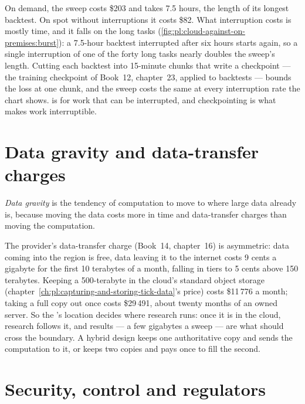 On demand, the sweep costs \$203 and takes 7.5 hours, the length of its longest backtest. On spot without interruptions it costs \$82. What
interruption costs is mostly time, and it falls on the long tasks (\cref{fig:pl:cloud-against-on-premises:burst}): a 7.5-hour backtest
interrupted after six hours starts again, so a single interruption of one of the forty long tasks nearly doubles the sweep's length. Cutting
each backtest into 15-minute chunks that write a checkpoint --- the training checkpoint of Book~12, chapter~23, applied to backtests --- bounds the
loss at one chunk, and the sweep costs the same at every interruption rate the chart shows.  is for work that can be interrupted,
and checkpointing is what makes work interruptible.

\section{Data gravity and data-transfer charges}

\begin{definition}\label{def:pl:cloud-against-on-premises:gravity}
\emph{Data gravity} is the tendency of computation to move to where large data already is, because moving the data costs
more in time and data-transfer charges than moving the computation.
\end{definition}

The provider's data-transfer charge (Book~14, chapter~16) is asymmetric: data coming into the region is free, data leaving it to the internet
costs 9 cents a gigabyte for the first 10 terabytes of a month, falling in tiers to 5 cents above 150 terabytes. Keeping a 500-terabyte  in the cloud's standard object storage (chapter~\ref{ch:pl:capturing-and-storing-tick-data}'s price) costs \$11\,776 a month; taking a
full copy out once costs \$29\,491, about twenty months of an owned server. So the 's location decides where research runs: once
it is in the cloud, research follows it, and results --- a few gigabytes a sweep --- are what should cross the boundary. A hybrid design keeps
one authoritative copy and sends the computation to it, or keeps two copies and pays once to fill the second.

\section{Security, control and regulators}

